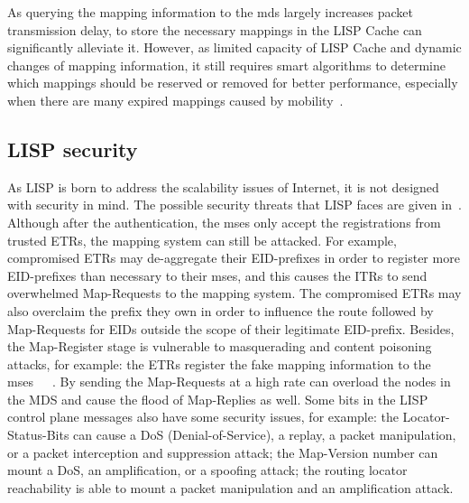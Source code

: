 As querying the mapping information to the \acrshort{mds} largely increases packet transmission delay, to store the necessary mappings in the LISP Cache can significantly alleviate it. However, as limited capacity of LISP Cache and dynamic changes of mapping information, it still requires smart algorithms to determine which mappings should be reserved or removed for better performance, especially when there are many expired mappings caused by mobility~\cite{feng2017locator}.


\subsection{LISP security}
\label{subsec:security}

As LISP is born to address the scalability issues of Internet, it is not designed with security in mind. The possible security threats that LISP faces are given in~\cite{rfc7835}. Although after the authentication, the \acrshort{ms}es only accept the registrations from trusted ETRs, the mapping system can still be attacked. For example, compromised ETRs may de-aggregate their EID-prefixes in order to register more EID-prefixes than necessary to their \acrshort{ms}es, and this causes the ITRs to send overwhelmed Map-Requests to the mapping system. The compromised ETRs may also overclaim the prefix they own in order to influence the route followed by Map-Requests for EIDs outside the scope of their legitimate EID-prefix. Besides, the Map-Register stage is vulnerable to masquerading and content poisoning attacks, for example: the ETRs register the fake mapping information to the \acrshort{ms}es~\cite{aiash2013securing}~\cite{montero2013securing}~\cite{aiash2013novel}. By sending the Map-Requests at a high rate can overload the nodes in the MDS and cause the flood of Map-Replies as well. Some bits in the LISP control plane messages also have some security issues, for example: the Locator-Status-Bits can cause a DoS (Denial-of-Service), a replay, a packet manipulation, or a packet interception and suppression attack; the Map-Version number can mount a DoS, an amplification, or a spoofing attack; the routing locator reachability is able to mount a packet manipulation and an amplification attack.

